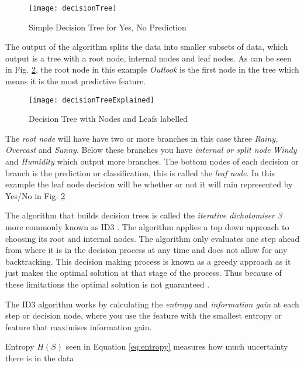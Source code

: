 \begin{figure}[H]
	\texttt{[image: decisionTree]}
	\caption{Simple Decision Tree for Yes, No Prediction \\ \cite[Source:][]{quinlan_induction_1986}}
	\label{fig:decisionTree}
\end{figure}

The output of the algorithm splits the data into smaller subsets of data, which output is a tree with a root node, internal nodes and leaf nodes. As can be seen in Fig. \ref{fig:decisionTreeExplained}, the root node in this example \textit{Outlook} is the first node in the tree which means it is the most predictive feature. 

\begin{figure}[H]
	\texttt{[image: decisionTreeExplained]}
	\caption{Decision Tree with Nodes and Leafs labelled}
	\label{fig:decisionTreeExplained}
\end{figure}

The \textit{root node} will have have two or more branches in this case three \textit{Rainy, Overcast} and \textit{Sunny}. Below these branches you have \textit{internal or split node} \textit{Windy} and \textit{Humidity} which output more branches. The bottom nodes of each decision or branch is the prediction or classification, this is called the \textit{leaf node}. In this example the leaf node decision will be whether or not it will rain represented by Yes/No in Fig. \ref{fig:decisionTreeExplained}

The algorithm that builds decision trees is called the \textit{iterative dichotomiser 3} more commonly known as ID3 \citep{quinlan_induction_1986}. The algorithm applies a top down approach to choosing its root and internal nodes. The algorithm only evaluates one step ahead from where it is in the decision process at any time and does not allow for any backtracking. This decision making process is known as a greedy approach as it just makes the optimal solution at that stage of the process. Thus because of these limitations the optimal solution is not guaranteed \citep{friedman_lazy_1996}.

The ID3 algorithm works by calculating the \textit{entropy} and \textit{information gain} at each step or decision node, where you use the feature with the smallest entropy or feature that maximises information gain.

Entropy $H(S)$ seen in Equation \ref{eq:entropy} measures how much uncertainty there is in the data \citep{shannon_mathematical_2001}

